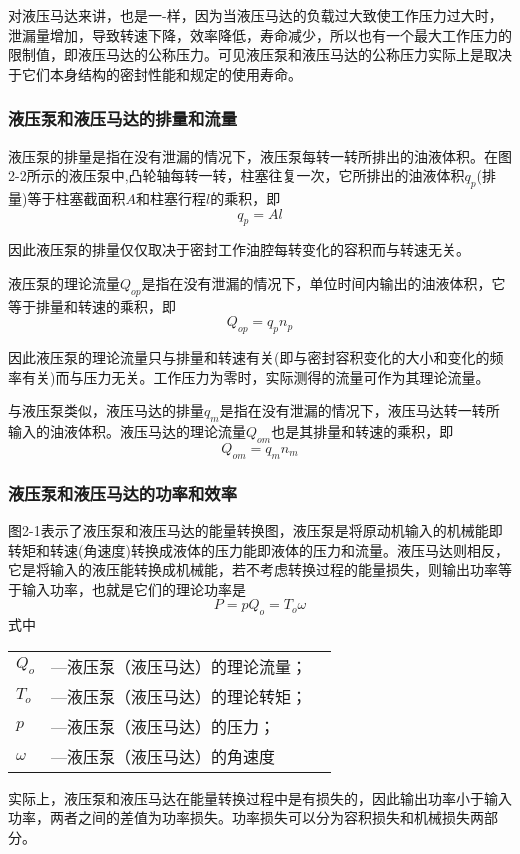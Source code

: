 
对液压马达来讲，也是一-样，因为当液压马达的负载过大致使工作压力过大时，泄漏量增加，导致转速下降，效率降低，寿命减少，所以也有一个最大工作压力的限制值，即液压马达的公称压力。可见液压泵和液压马达的公称压力实际上是取决于它们本身结构的密封性能和规定的使用寿命。
\subsubsection{液压泵和液压马达的排量和流量}
液压泵的排量是指在没有泄漏的情况下，液压泵每转一转所排出的油液体积。在图2-2所示的液压泵中,凸轮轴每转一转，柱塞往复一次，它所排出的油液体积$q_{p}$(排量)等于柱塞截面积$A$和柱塞行程$l$的乘积，即
\begin{equation}
  q_{p}={A}{l}
\end{equation}

因此液压泵的排量仅仅取决于密封工作油腔每转变化的容积而与转速无关。

液压泵的理论流量$Q_{op}$是指在没有泄漏的情况下，单位时间内输出的油液体积，它等于排量和转速的乘积，即
\begin{equation}
  Q_{op}={q_{p}}{n_{p}}
\end{equation}

因此液压泵的理论流量只与排量和转速有关(即与密封容积变化的大小和变化的频率有关)而与压力无关。工作压力为零时，实际测得的流量可作为其理论流量。

与液压泵类似，液压马达的排量$q_{m}$是指在没有泄漏的情况下，液压马达转一转所输入的油液体积。液压马达的理论流量$Q_{om}$也是其排量和转速的乘积，即
\begin{equation}
  Q_{om}={q_{m}}{n_{m}}
\end{equation}

\subsubsection{液压泵和液压马达的功率和效率}
图2-1表示了液压泵和液压马达的能量转换图，液压泵是将原动机输入的机械能即转矩和转速(角速度)转换成液体的压力能即液体的压力和流量。液压马达则相反，它是将输入的液压能转换成机械能，若不考虑转换过程的能量损失，则输出功率等于输入功率，也就是它们的理论功率是
\begin{equation}
  P={p}{Q_{o}}={T_{o}}{\omega }
\end{equation}
\noindent 式中\
\begin{tabular}[t]{lll}
  $Q_{o}$ &---液压泵（液压马达）的理论流量；\\
  $T_{o}$ &---液压泵（液压马达）的理论转矩；\\
  $p$ &---液压泵（液压马达）的压力；\\
  $\omega$ &---液压泵（液压马达）的角速度
  \end{tabular}
实际上，液压泵和液压马达在能量转换过程中是有损失的，因此输出功率小于输入功率，两者之间的差值为功率损失。功率损失可以分为容积损失和机械损失两部分。

